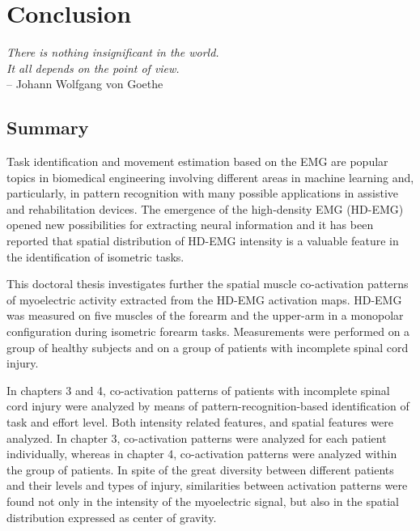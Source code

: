 \chapter{Conclusion}
\label{ch:conclusions}


\narrowlinespacing
\begin{myquote}
\begin{flushright}
\textit{There is nothing insignificant in the world. \\It all depends on the point of view.} \\-- Johann Wolfgang von Goethe
\end{flushright}
\end{myquote}
\normallinespacing

\section{Summary}

Task identification and movement estimation based on the EMG are popular topics in biomedical engineering involving different areas in machine learning and, particularly, in pattern recognition with many possible applications in assistive and rehabilitation devices. The emergence of the high-density EMG (HD-EMG) opened new possibilities for extracting neural information and it has been reported that spatial distribution of HD-EMG intensity is a valuable feature in the identification of isometric tasks.

This doctoral thesis investigates further the spatial muscle co-activation patterns of myoelectric activity extracted from the HD-EMG activation maps. HD-EMG was measured on five muscles of the forearm and the upper-arm in a monopolar configuration during isometric forearm tasks. Measurements were performed on a group of healthy subjects and on a group of patients with incomplete spinal cord injury.

In chapters 3 and 4, co-activation patterns of patients with incomplete spinal cord injury were analyzed by means of pattern-recognition-based identification of task and effort level. Both intensity related features, and spatial features were analyzed. In chapter 3, co-activation patterns were analyzed for each patient individually, whereas in chapter 4, co-activation patterns were analyzed within the group of patients. In spite of the great diversity between different patients and their levels and types of injury, similarities between activation patterns were found not only in the intensity of the myoelectric signal, but also in the spatial distribution expressed as center of gravity.

